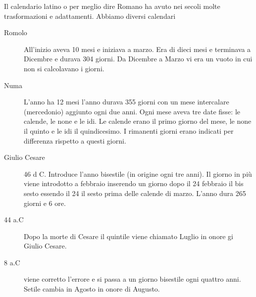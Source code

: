 \documentclass[10pt,a4paper]{book}
\begin{document}
	Il calendario latino o per meglio dire Romano ha avuto nei secoli molte trasformazioni e adattamenti.
	Abbiamo diversi calendari 
	\begin{description}
		\item[Romolo] All'inizio aveva 10 mesi e iniziava a marzo. Era di dieci mesi e terminava a Dicembre e durava 304 giorni. Da Dicembre a Marzo vi era un vuoto in cui non si calcolavano i giorni. 
		\item [Numa] L'anno ha 12 mesi l'anno durava 355 giorni con un mese intercalare (mercedonio) aggiunto ogni due anni. Ogni mese aveva tre date fisse: le calende, le none e le idi. Le calende erano il primo giorno del mese, le none il quinto e le idi il quindicesimo. I rimanenti giorni erano indicati per differenza rispetto a questi giorni.
		\item [Giulio Cesare]  46 d C. Introduce l'anno bisestile (in origine ogni tre anni). Il giorno in più viene introdotto a febbraio inserendo un giorno dopo il 24 febbraio il bis sesto essendo il 24 il sesto prima delle calende di marzo.  L'anno dura 265 giorni e 6 ore.
		\item [44 a.C] Dopo la morte di Cesare il quintile viene chiamato Luglio in onore gi Giulio Cesare.
		\item [8 a.C] viene corretto l'errore e si passa a un giorno bisestile ogni quattro anni. 
		Setile cambia in Agosto in onore di Augusto. 
	\end{description}
	
	
\end{document}
